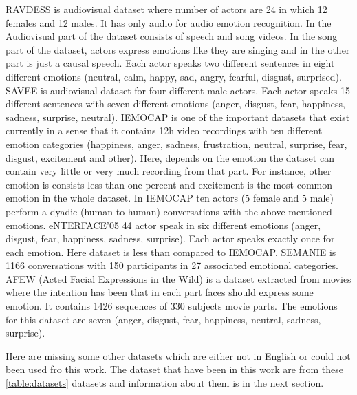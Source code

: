 \documentclass[oneside]{report}
\begin{document}
    
    RAVDESS \cite{RAVDESS} is audiovisual dataset where number of actors are 24 in which 12 females and 12 males. It has only audio for audio emotion recognition. In the Audiovisual part of the dataset consists of speech and song videos. In the song part of the dataset, actors express emotions like they are singing and in the other part is just a causal speech. Each actor speaks two different sentences in eight different emotions (neutral, calm, happy, sad, angry, fearful, disgust, surprised). SAVEE \cite{savee} is audiovisual dataset for four different male actors. Each actor speaks 15 different sentences with seven different emotions (anger, disgust, fear, happiness, sadness, surprise, neutral). IEMOCAP \cite{iemocap} is one of the important  datasets that exist currently in a sense that it contains 12h video recordings with ten different emotion categories (happiness, anger, sadness, frustration, neutral, surprise, fear, disgust, excitement and other). Here, depends on the emotion the dataset can contain very little or very much recording from that part. For instance, other emotion is consists less than one percent and excitement is the most common emotion in the whole dataset. In IEMOCAP ten actors (5 female and 5 male) perform a dyadic (human-to-human) conversations with the above mentioned emotions. eNTERFACE'05 \cite{enterface} 44 actor speak in six different emotions (anger, disgust, fear, happiness, sadness, surprise). Each actor speaks exactly once for each emotion. Here dataset is less than compared to IEMOCAP. SEMANIE \cite{semanie} is 1166 conversations with 150 participants in 27 associated emotional categories. AFEW (Acted Facial Expressions in the Wild) \cite{afew} is a dataset extracted from movies where the intention has been that in each part faces should express some emotion. It contains 1426 sequences of 330 subjects movie parts. The emotions for this dataset are seven (anger, disgust, fear, happiness, neutral, sadness, surprise). 
    
    Here are missing some other datasets which are either not in English or could not been used fro this work. The dataset that have been in this work are from these \ref{table:datasets} datasets and information about them is in the next section. 
    
\end{document}

